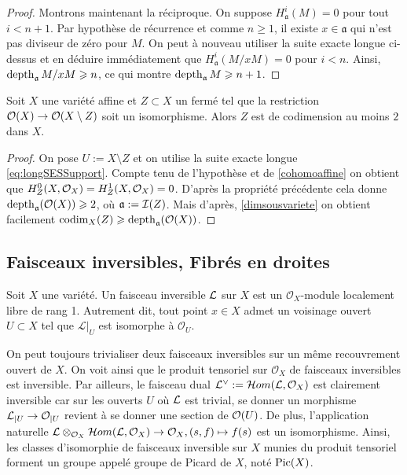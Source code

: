 \begin{proof}
Montrons maintenant la réciproque. On suppose $H^i_\mathfrak{a}(M)=0$ pour tout $i<n+1$. Par hypothèse de récurrence et comme $n\geq 1$, il existe $x\in \mathfrak{a}$ qui n'est pas diviseur de zéro pour $M$. On peut à nouveau utiliser la suite exacte longue ci-dessus et en déduire immédiatement que $H^{i}_\mathfrak{a}(M/xM)=0$ pour $i<n$. Ainsi, $\operatorname{depth}_\mathfrak{a} M/xM\geqslant n$, ce qui montre $\operatorname{depth}_\mathfrak{a} M \geqslant n+1$.
\end{proof}

\begin{cor}\label{cohomcodimgeq2}
Soit $X$ une variété affine et $Z\subset X$ un fermé tel que la restriction $\mathcal{O}(X)\rightarrow \mathcal{O}(X\setminus Z)$ soit un isomorphisme. Alors $Z$ est de codimension au moins $2$ dans $X$.
\end{cor}
\begin{proof}
On pose $U:=X\setminus Z$ et on utilise la suite exacte longue \ref{eq:longSESSupport}. Compte tenu de l'hypothèse et de \ref{cohomoaffine} on obtient que $H^0_Z(X,\mathcal{O}_X)=H^1_Z(X,\mathcal{O}_X)=0$. D'après la propriété précédente cela donne $\operatorname{depth}_\mathfrak{a}(\mathcal{O}(X))\geqslant 2$, où $\mathfrak{a}:=\mathcal{I}(Z)$. Mais d'après, \ref{dimsousvariete} on obtient facilement $\operatorname{codim}_X(Z)\geqslant \operatorname{depth}_\mathfrak{a}(\mathcal{O}(X))$.
\end{proof}


\subsection{Faisceaux inversibles, Fibrés en droites}
\begin{defn}
Soit $X$ une variété. Un faisceau inversible $\mathcal{L}$ sur $X$ est un $\mathcal{O}_X$-module localement libre de rang 1. Autrement dit, tout point $x\in X$ admet un voisinage ouvert $U \subset X$ tel que ${\mathcal L}|_U$ est isomorphe à ${\mathcal O}_U$.
\end{defn}

On peut toujours trivialiser deux faisceaux inversibles sur un même recouvrement ouvert de $X$. On voit ainsi que le produit tensoriel sur $\mathcal{O}_X$ de faisceaux inversibles est inversible. Par ailleurs, le faisceau dual $\mathcal{L}^\vee:=\mathcal{H} om(\mathcal{L},\mathcal{O}_X)$ est clairement inversible car sur les ouverts $U$ où $\mathcal{L}$ est trivial, se donner un morphisme $\mathcal{L}_{|U}\rightarrow\mathcal{O}_{|U}$ revient à se donner une section de $\mathcal{O}(U)$. De plus, l'application naturelle $\mathcal{L}\otimes_{\mathcal{O}_X} \mathcal{H} om(\mathcal{L},\mathcal{O}_X)\rightarrow \mathcal{O}_X, (s,f)\mapsto f(s)$ est un isomorphisme. Ainsi, les classes d'isomorphie de faisceaux inversible sur $X$ munies du produit tensoriel forment un groupe appelé groupe de Picard de $X$, noté $\operatorname{Pic}(X)$. 

